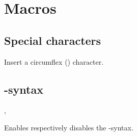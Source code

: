 \documentclass[11pt, cm-default]{l3doc}
\begin{document}


	\section{Macros}
	\subsection{Special characters}
	\begin{function}{\cir}
		\begin{syntax}
		\end{syntax}
		Insert a circumflex (\cir) character.
	\end{function}



	\subsection{-syntax}
	\begin{function}{\enableeasyformat, \disableeasyformat}
		\begin{syntax}
		\end{syntax}
		Enables respectively disables the -syntax.
	\end{function}
	
\end{document}
